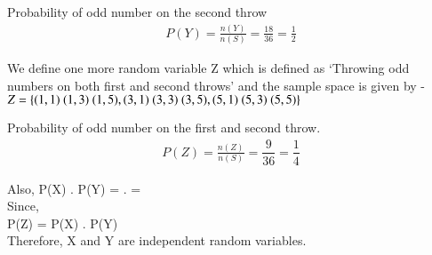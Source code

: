 \documentclass[journal,12pt,twocolumn]{IEEEtran}
\begin{document}
Probability of odd number on the second throw\\
\begin{align}
    P(Y) = \frac{n(Y)}{n(S)} = \frac{18}{36} = \frac{1}{2}
\end{align}

We define one more random variable Z which is defined as `Throwing odd numbers on both first and second throws' and the sample space is given by - \\
$
Z = \{\\
(1,1)\ (1,3)\ (1,5),\\
(3,1)\ (3,3)\ (3,5),\\
(5,1)\ (5,3)\ (5,5) \}$

Probability of odd number on the first and second throw.\\
\begin{align}
    P(Z) = \frac{n(Z)}{n(S)} = \dfrac{9}{36} = \dfrac{1}{4}
\end{align}

Also, P(X) . P(Y) =  .  = \\

Since,\\ P(Z) = P(X) . P(Y)\\
Therefore, X and Y are independent random variables.
\end{document}
